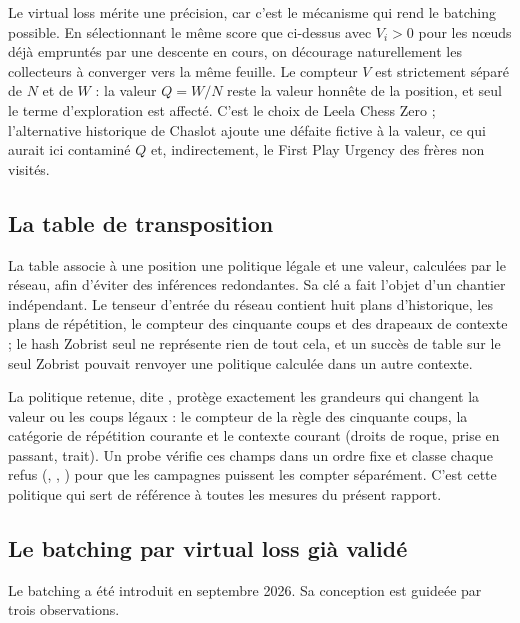 Le virtual loss m\'erite une pr\'ecision, car c'est le m\'ecanisme qui rend le
batching possible. En s\'electionnant le m\^eme score que ci-dessus avec
$V_i > 0$ pour les n\oe{}uds d\'ej\`a emprunt\'es par une descente en cours, on
d\'ecourage naturellement les collecteurs \`a converger vers la m\^eme
feuille. Le compteur $V$ est strictement s\'epar\'e de $N$ et de $W$ : la
valeur $Q = W/N$ reste la valeur honn\^ete de la position, et seul le terme
d'exploration est affect\'e. C'est le choix de Leela Chess Zero
\cite{lc0} ; l'alternative historique de Chaslot \cite{chaslot} ajoute une
d\'efaite fictive \`a la valeur, ce qui aurait ici contamin\'e $Q$ et,
indirectement, le First Play Urgency des fr\`eres non visit\'es.

\subsection{La table de transposition }

La table associe \`a une position une politique l\'egale et une valeur,
calcul\'ees par le r\'eseau, afin d'\'eviter des inf\'erences redondantes. Sa
cl\'e a fait l'objet d'un chantier ind\'ependant. Le tenseur d'entr\'ee du
r\'eseau contient huit plans d'historique, les plans de r\'ep\'etition, le
compteur des cinquante coups et des drapeaux de contexte ; le hash Zobrist
seul ne repr\'esente rien de tout cela, et un succ\`es de table sur le seul
Zobrist pouvait renvoyer une politique calcul\'ee dans un autre contexte.

La politique retenue, dite , prot\`ege exactement les grandeurs qui
changent la valeur ou les coups l\'egaux : le compteur de la r\`egle des
cinquante coups, la cat\'egorie de r\'ep\'etition courante et le contexte
courant (droits de roque, prise en passant, trait). Un probe v\'erifie ces
champs dans un ordre fixe et classe chaque refus (,
, ) pour que les campagnes
puissent les compter s\'epar\'ement. C'est cette politique qui sert de
r\'ef\'erence \`a toutes les mesures du pr\'esent rapport.

\subsection{Le batching par virtual loss gi\`a valid\'e}

Le batching a \'et\'e introduit en septembre 2026. Sa conception
\cite{batching-design} est guide\'ee par trois observations.

